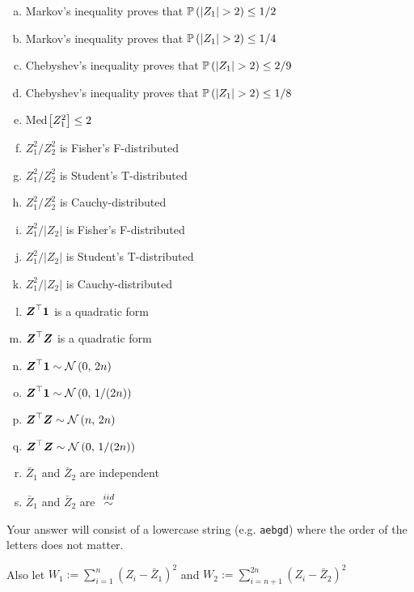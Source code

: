 \documentclass[12pt,landscape]{article}
\newcommand{\instr}{\small Your answer will consist of a lowercase string (e.g. \texttt{aebgd}) where the order of the letters does not matter. \normalsize}
\begin{document}
\begin{enumerate}[(a)]
\item Markov's inequality proves that $\mathbb{P}\left(|Z_1| > 2\right) \leq 1/2$
\item Markov's inequality proves that $\mathbb{P}\left(|Z_1| > 2\right) \leq 1/4$
\item Chebyshev's inequality proves that $\mathbb{P}\left(|Z_1| > 2\right) \leq 2/9$
\item Chebyshev's inequality proves that $\mathbb{P}\left(|Z_1| > 2\right) \leq 1/8$
\item Med$\left[Z_1^2\right] \leq 2$

\item $Z_1^2 / Z_2^2$ is Fisher's F-distributed
\item $Z_1^2 / Z_2^2$ is Student's T-distributed
\item $Z_1^2 / Z_2^2$ is Cauchy-distributed
\item $Z_1^2 / |Z_2|$ is Fisher's F-distributed
\item $Z_1^2 / |Z_2|$ is Student's T-distributed
\item $Z_1^2 / |Z_2|$ is Cauchy-distributed

\item $\boldsymbol{Z}^\top\boldsymbol{1}$ is a quadratic form
\item $\boldsymbol{Z}^\top\boldsymbol{Z}$ is a quadratic form
\item $\boldsymbol{Z}^\top\boldsymbol{1} \sim \mathcal{N}\left(0,\,2n\right)$
\item $\boldsymbol{Z}^\top\boldsymbol{1} \sim \mathcal{N}\left(0,\,1/(2n)\right)$
\item $\boldsymbol{Z}^\top\boldsymbol{Z} \sim \mathcal{N}\left(n,\,2n\right)$
\item $\boldsymbol{Z}^\top\boldsymbol{Z} \sim \mathcal{N}\left(0,\,1/(2n)\right)$
\item $\bar{Z}_1$ and $\bar{Z}_2$ are independent
\item $\bar{Z}_1$ and $\bar{Z}_2$ are $\iid$
\end{enumerate}
\eenum\instr\pagebreak



\problem{}  Also let $W_1 := \displaystyle\sum_{i=1}^n (Z_i - \bar{Z}_1)^2$ and $W_2 := \displaystyle\sum_{i=n+1}^{2n} (Z_i - \bar{Z}_2)^2$
\end{document}
